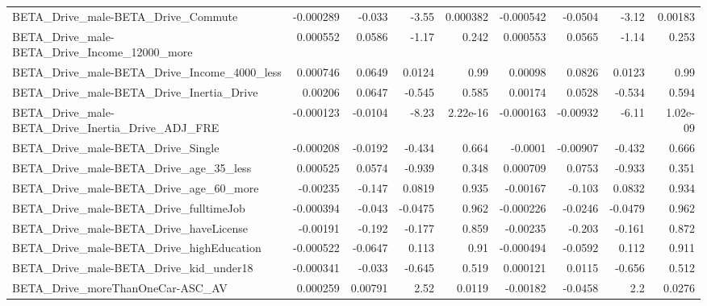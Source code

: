 \begin{tabular}{lrrrrrrrr}
BETA\_Drive\_male-BETA\_Drive\_Commute                 &   -0.000289 &       -0.033 &    -3.55 & 0.000382 &  -0.000542 &     -0.0504 &        -3.12 &       0.00183 \\
BETA\_Drive\_male-BETA\_Drive\_Income\_12000\_more       &    0.000552 &       0.0586 &    -1.17 &    0.242 &   0.000553 &      0.0565 &        -1.14 &         0.253 \\
BETA\_Drive\_male-BETA\_Drive\_Income\_4000\_less        &    0.000746 &       0.0649 &   0.0124 &     0.99 &    0.00098 &      0.0826 &       0.0123 &          0.99 \\
BETA\_Drive\_male-BETA\_Drive\_Inertia\_Drive           &     0.00206 &       0.0647 &   -0.545 &    0.585 &    0.00174 &      0.0528 &       -0.534 &         0.594 \\
BETA\_Drive\_male-BETA\_Drive\_Inertia\_Drive\_ADJ\_FRE   &   -0.000123 &      -0.0104 &    -8.23 & 2.22e-16 &  -0.000163 &    -0.00932 &        -6.11 &      1.02e-09 \\
BETA\_Drive\_male-BETA\_Drive\_Single                  &   -0.000208 &      -0.0192 &   -0.434 &    0.664 &    -0.0001 &    -0.00907 &       -0.432 &         0.666 \\
BETA\_Drive\_male-BETA\_Drive\_age\_35\_less             &    0.000525 &       0.0574 &   -0.939 &    0.348 &   0.000709 &      0.0753 &       -0.933 &         0.351 \\
BETA\_Drive\_male-BETA\_Drive\_age\_60\_more             &    -0.00235 &       -0.147 &   0.0819 &    0.935 &   -0.00167 &      -0.103 &       0.0832 &         0.934 \\
BETA\_Drive\_male-BETA\_Drive\_fulltimeJob             &   -0.000394 &       -0.043 &  -0.0475 &    0.962 &  -0.000226 &     -0.0246 &      -0.0479 &         0.962 \\
BETA\_Drive\_male-BETA\_Drive\_haveLicense             &    -0.00191 &       -0.192 &   -0.177 &    0.859 &   -0.00235 &      -0.203 &       -0.161 &         0.872 \\
BETA\_Drive\_male-BETA\_Drive\_highEducation           &   -0.000522 &      -0.0647 &    0.113 &     0.91 &  -0.000494 &     -0.0592 &        0.112 &         0.911 \\
BETA\_Drive\_male-BETA\_Drive\_kid\_under18             &   -0.000341 &       -0.033 &   -0.645 &    0.519 &   0.000121 &      0.0115 &       -0.656 &         0.512 \\
BETA\_Drive\_moreThanOneCar-ASC\_AV                   &    0.000259 &      0.00791 &     2.52 &   0.0119 &   -0.00182 &     -0.0458 &          2.2 &        0.0276 \\

\end{tabular}
